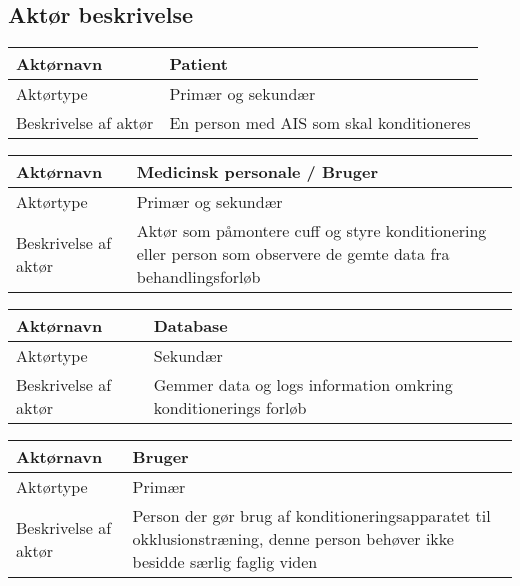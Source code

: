 	\subsection{Aktør beskrivelse}
	\begin{center}
		\begin{tabular}{ | m{4cm} | m{8cm}| } 
			\hline
			Aktørnavn& Patient \\ 
			\hline
			Aktørtype & Primær og sekundær \\ 
			\hline
			Beskrivelse af aktør & En person med AIS som skal konditioneres\\ 
			\hline
		\end{tabular}
	\end{center}
	
	\begin{center}
		\begin{tabular}{ | m{4cm} | m{8cm}| } 
			\hline
			Aktørnavn& Medicinsk personale / Bruger \\ 
			\hline
			Aktørtype & Primær og sekundær \\ 
			\hline
			Beskrivelse af aktør & Aktør som påmontere cuff og styre konditionering eller person som observere de gemte data fra behandlingsforløb\\ 
			\hline
		\end{tabular}
	\end{center}
	
	\begin{center}
		\begin{tabular}{ | m{4cm} | m{8cm}| } 
			\hline
			Aktørnavn& Database \\ 
			\hline
			Aktørtype & Sekundær \\ 
			\hline
			Beskrivelse af aktør & Gemmer data og logs information omkring konditionerings forløb\\ 
			\hline
		\end{tabular}
	\end{center}
	
	\begin{center}
		\begin{tabular}{ | m{4cm} | m{8cm}| } 
			\hline
			Aktørnavn& Bruger \\ 
			\hline
			Aktørtype & Primær \\ 
			\hline
			Beskrivelse af aktør & Person der gør brug af konditioneringsapparatet til okklusionstræning, denne person behøver ikke besidde særlig faglig viden \\ 
			\hline
		\end{tabular}
	\end{center}